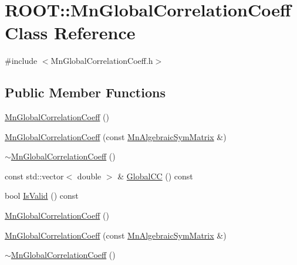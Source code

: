 \hypertarget{classROOT_1_1Minuit2_1_1MnGlobalCorrelationCoeff}{}\section{R\+O\+OT\+:\+:Mn\+Global\+Correlation\+Coeff Class Reference}
\label{classROOT_1_1Minuit2_1_1MnGlobalCorrelationCoeff}


{\ttfamily \#include $<$Mn\+Global\+Correlation\+Coeff.\+h$>$}

\subsection*{Public Member Functions}
\begin{DoxyCompactItemize}
\item 
\mbox{\hyperlink{classROOT_1_1Minuit2_1_1MnGlobalCorrelationCoeff_a02d0479009453f093434429ce1eadf0a}{Mn\+Global\+Correlation\+Coeff}} ()
\item 
\mbox{\hyperlink{classROOT_1_1Minuit2_1_1MnGlobalCorrelationCoeff_a0781ecab575fcbc6dc59bfd85b1b978d}{Mn\+Global\+Correlation\+Coeff}} (const \mbox{\hyperlink{namespaceROOT_1_1Minuit2_a9e74ad97f5537a2e80e52b04d98ecc6e}{Mn\+Algebraic\+Sym\+Matrix}} \&)
\item 
\mbox{\hyperlink{classROOT_1_1Minuit2_1_1MnGlobalCorrelationCoeff_a2fb461accef753e2402948f0e2603d7a}{$\sim$\+Mn\+Global\+Correlation\+Coeff}} ()
\item 
const std\+::vector$<$ double $>$ \& \mbox{\hyperlink{classROOT_1_1Minuit2_1_1MnGlobalCorrelationCoeff_ab078e8b07600339fea0af842a8e2de00}{Global\+CC}} () const
\item 
bool \mbox{\hyperlink{classROOT_1_1Minuit2_1_1MnGlobalCorrelationCoeff_a1fe4d8b557ebda40e092ed3b7032fc44}{Is\+Valid}} () const
\item 
\mbox{\hyperlink{classROOT_1_1Minuit2_1_1MnGlobalCorrelationCoeff_a02d0479009453f093434429ce1eadf0a}{Mn\+Global\+Correlation\+Coeff}} ()
\item 
\mbox{\hyperlink{classROOT_1_1Minuit2_1_1MnGlobalCorrelationCoeff_a0781ecab575fcbc6dc59bfd85b1b978d}{Mn\+Global\+Correlation\+Coeff}} (const \mbox{\hyperlink{namespaceROOT_1_1Minuit2_a9e74ad97f5537a2e80e52b04d98ecc6e}{Mn\+Algebraic\+Sym\+Matrix}} \&)
\item 
\mbox{\hyperlink{classROOT_1_1Minuit2_1_1MnGlobalCorrelationCoeff_a2fb461accef753e2402948f0e2603d7a}{$\sim$\+Mn\+Global\+Correlation\+Coeff}} ()

\end{DoxyCompactItemize}
